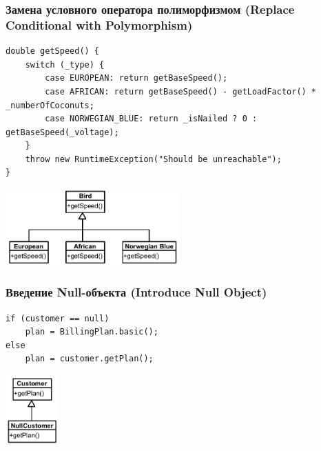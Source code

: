 \documentclass{../../slides-style}
\begin{document}
    \begin{frame}[fragile]
        \frametitle{Замена условного оператора полиморфизмом (Replace Conditional with Polymorphism)}
        \begin{footnotesize}
            \begin{verbatim}
double getSpeed() {
    switch (_type) {
        case EUROPEAN: return getBaseSpeed();
        case AFRICAN: return getBaseSpeed() - getLoadFactor() * _numberOfCoconuts;
        case NORWEGIAN_BLUE: return _isNailed ? 0 : getBaseSpeed(_voltage);
    }
    throw new RuntimeException("Should be unreachable");
}
            \end{verbatim}
        \end{footnotesize}
        
        \hspace{2cm}{\Huge{$\Downarrow$}}
        
        \begin{center}
            \includegraphics[width=0.5\textwidth]{replaceConditionalWithPolymorphism.png}
        \end{center}
    \end{frame}

    \begin{frame}[fragile]
        \frametitle{Введение Null-объекта (Introduce Null Object)}
        \begin{verbatim}
if (customer == null)
    plan = BillingPlan.basic();
else
    plan = customer.getPlan();
        \end{verbatim}
        
        \hspace{2cm}{\Huge{$\Downarrow$}}
        
        \begin{center}
            \includegraphics[width=0.15\textwidth]{nullObject.png}
        \end{center}
    \end{frame}
\end{document}
